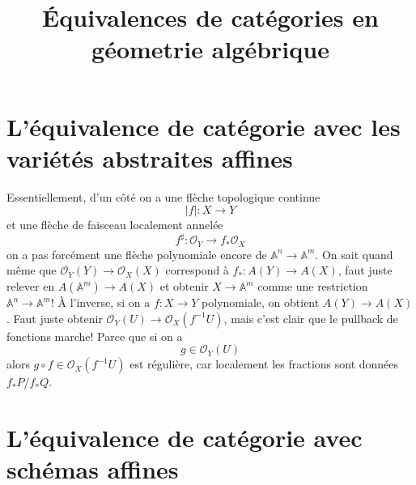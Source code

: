 \documentclass[a4paper,12pt]{book}
\title{Équivalences de catégories en géometrie algébrique}
\date{}
\newcommand{\A}{\mathbb{A}}
\newcommand{\Or}{\mathcal{O}}
\theoremstyle{plain}
\theoremstyle{definition}
\theoremstyle{remark}
\begin{document}
\maketitle
\tableofcontents



\section{L'équivalence de catégorie avec les variétés abstraites affines}
Essentiellement, d'un côté on a une flèche topologique continue 
\[|f|\colon X\to Y\]
et une flèche de faisceau localement annelée
\[f^\sharp\colon \Or_Y\to f_*\Or_X\]
on a pas forcément une flèche polynomiale encore de $\A^n\to \A^m$.
On sait quand même que $\Or_Y(Y)\to \Or_X(X)$ correspond à 
$f_*\colon A(Y)\to A(X)$, faut juste relever en $A(\A^m)\to A(X)$
et obtenir $X\to \A^m$ comme une restriction $\A^n\to \A^m$! À l'inverse,
si on a $f\colon X\to Y$ polynomiale, on obtient $A(Y)\to A(X)$. Faut
juste obtenir $\Or_Y(U)\to \Or_X(f^{-1} U)$, mais c'est clair que le 
pullback de fonctions marche! Parce que si on a 
\[g\in \Or_Y(U)\]
alors $g\circ f\in \Or_X(f^{-1}U)$ est régulière, car localement
les fractions sont données $f_*P/f_*Q$.




\section{L'équivalence de catégorie avec schémas affines}
\end{document}

